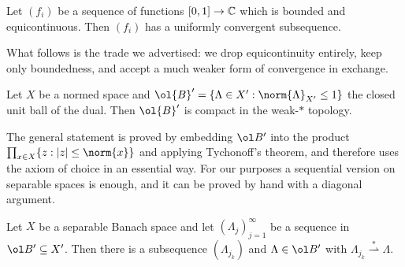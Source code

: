 \documentclass[a4paper]{scrartcl}
\newcommand{\wsto}{\overset{*}{\rightharpoonup}}
\begin{document}
\begin{theorem}\label{thm:arzela}
	Let $(f_i)$ be a sequence of functions $[0,1]\to\mathbb{C}$ which is bounded and equicontinuous. Then $(f_i)$ has a uniformly convergent subsequence.
\end{theorem}

What follows is the trade we advertised: we drop equicontinuity entirely, keep only boundedness, and accept a much weaker form of convergence in exchange.

\begin{theorem}\label{thm:alaoglu}
	Let $X$ be a normed space and $\ol{B}' = \{\Lambda \in X' : \norm{\Lambda}_{X'}\le 1\}$ the closed unit ball of the dual. Then $\ol{B}'$ is compact in the weak-$*$ topology.
\end{theorem}

The general statement is proved by embedding $\ol B'$ into the product $\prod_{x \in X}\{z : |z| \le \norm{x}\}$ and applying Tychonoff's theorem, and therefore uses the axiom of choice in an essential way. For our purposes a sequential version on separable spaces is enough, and it can be proved by hand with a diagonal argument.

\begin{theorem}\label{thm:alaoglu2}
	Let $X$ be a separable Banach space and let $(\Lambda_j)_{j=1}^\infty$ be a sequence in $\ol B' \subseteq X'$. Then there is a subsequence $(\Lambda_{j_k})$ and $\Lambda \in \ol B'$ with $\Lambda_{j_k}\wsto\Lambda$.
\end{theorem}
\end{document}
